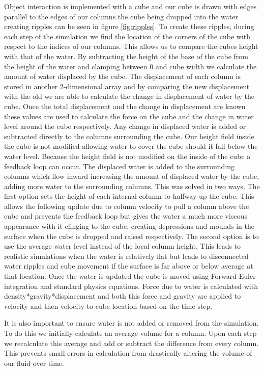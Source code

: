 \documentclass[11pt]{article}
\begin{document}
Object interaction is implemented with a cube and our cube is drawn with edges 
parallel to the edges of our columns the cube being dropped into the water 
creating ripples can be seen in figure \ref{fig:ripples}. To create these 
ripples, during each step of 
the simulation we 
find the location of the corners of the cube with respect to the indices of our 
columns. This allows us to compare the cubes height with that of the water. 
By subtracting the height of the base of the cube from the height of the water 
and clamping between 0 and cube width we calculate the amount of water 
displaced by the cube. The displacement of each column is stored in another 
2-dimensional array and by comparing the new displacement with the old we are 
able to calculate the change in displacement of water by the cube. Once the 
total displacement and the change in displacement are known these values are 
used to calculate the force on the cube and the change in water level around 
the cube respectively. Any change in displaced water is added or subtracted 
directly to the columns surrounding the cube. Our height field inside the cube 
is not modified allowing water to cover the cube should it fall below the water 
level. Because the height field is not modified on the inside of the cube a 
feedback loop can occur. The displaced water is added to the surrounding 
columns which flow inward increasing the amount of displaced water by the cube, 
adding more water to the surrounding columns. This was solved in two ways. 
The first option sets the height of each internal column to halfway up the 
cube. This allows the following update due to column velocity to pull a column 
above the cube and prevents the feedback loop but gives the water a much more 
viscous appearance with it clinging to the cube, creating depressions and 
mounds in the surface when the cube is dropped and raised respectively. The 
second option is to use the average water level instead of the local column 
height. This leads to realistic simulations when the water is relatively flat 
but leads to disconnected water ripples and cube movement if the surface is far 
above or below average at that location. Once the water is updated the cube is 
moved using Forward Euler integration and standard physics equations. Force 
due to water is calculated with density*gravity*displacement and both this 
force and gravity are applied to velocity and then velocity to cube location 
based on the time step.

It is also important to ensure water is not added or removed from the 
simulation. To do this we initially calculate an average volume for a column. 
Upon each step we recalculate this average and add or subtract the difference 
from every column. This prevents small errors in calculation from drastically 
altering the volume of our fluid over time.
\end{document}
